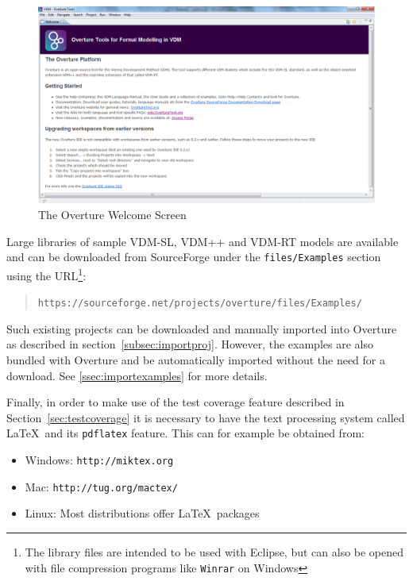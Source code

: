 \documentclass{overturerepchap}
\newcommand{\url}[1]{\texttt{#1}}
\begin{document}
\begin{figure}[!htb]
\begin{center}
  \includegraphics[width=\textwidth]{screenDumps/welcomeWindow}
  \caption{The Overture Welcome Screen}
  \label{fig:userguire:welcomeWindow}
\end{center}
\end{figure}

Large libraries of sample VDM-SL, VDM++ and VDM-RT models are available
and can be downloaded from SourceForge under the
\texttt{files/Examples} section using the URL\footnote{The library
  files are intended to be used with Eclipse, but can also be opened with
  file compression programs like \texttt{Winrar} on Windows}:
\begin{quote}
\url{https://sourceforge.net/projects/overture/files/Examples/}
\end{quote}

Such existing projects can be downloaded and manually imported into Overture as
described in section~\ref{subsec:importproj}. However, the examples are 
also bundled with Overture and be automatically imported without the need for
a download. See \autoref{ssec:importexamples} for more details.

Finally, in order to make use of the
test coverage feature described in Section~\ref{sec:testcoverage} it is
necessary to have the text processing system called \LaTeX\ and its
\texttt{pdflatex} feature. This can for example be obtained from:

\begin{itemize}
    \item Windows: \url{http://miktex.org}
    \item Mac: \url{http://tug.org/mactex/}
    \item Linux: Most distributions offer \LaTeX\ packages
\end{itemize}
\end{document}

